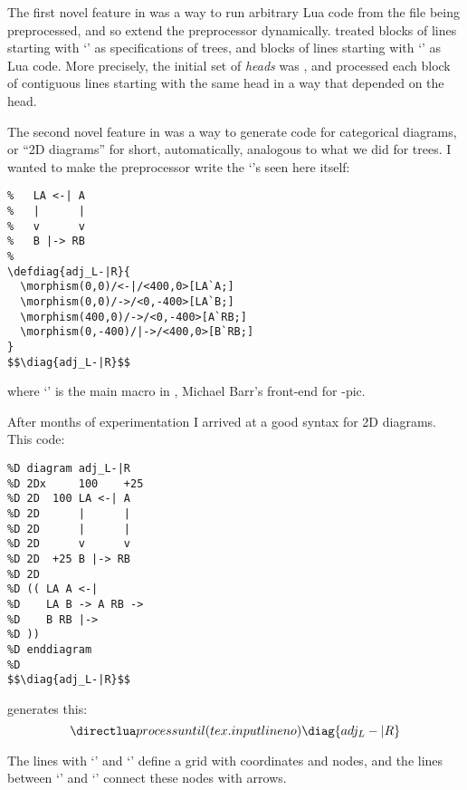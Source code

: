 \documentclass{ltugboat}
\begin{document}
The first novel feature in  was a way to run arbitrary Lua
code from the  file being preprocessed, and so extend the
preprocessor dynamically.  treated blocks of lines starting
with `\co{\%:}' as specifications of trees, and blocks of lines
starting with `' as Lua code. More precisely, the initial set
of {\sl heads} was , and 
processed each block of contiguous lines starting with the same head
in a way that depended on the head.

The second novel feature in  was a way to generate code for
categorical diagrams, or ``2D diagrams'' for short, automatically,
analogous to what we did for trees. I wanted to make the preprocessor write
the `'s seen here itself:

\begin{verbatim}
%   LA <-| A
%   |      |
%   v      v
%   B |-> RB
%
\defdiag{adj_L-|R}{
  \morphism(0,0)/<-|/<400,0>[LA`A;]
  \morphism(0,0)/->/<0,-400>[LA`B;]
  \morphism(400,0)/->/<0,-400>[A`RB;]
  \morphism(0,-400)/|->/<400,0>[B`RB;]
}
$$\diag{adj_L-|R}$$
\end{verbatim}
%
where `\co{\\morphism}' is the main macro in , Michael
Barr's front-end for \Xy-pic.

After months of experimentation I arrived at a good syntax for 2D
diagrams. This code:

\begin{verbatim}
%D diagram adj_L-|R
%D 2Dx     100    +25
%D 2D  100 LA <-| A
%D 2D      |      |
%D 2D      |      |
%D 2D      v      v
%D 2D  +25 B |-> RB
%D 2D
%D (( LA A <-|
%D    LA B -> A RB ->
%D    B RB |->
%D ))
%D enddiagram
%D
$$\diag{adj_L-|R}$$
\end{verbatim}
%
generates this:
%
$$\pu
  \diag{adj_L-|R}
$$

The lines with `' and `' define a grid with
coordinates and nodes, and the lines between `' and
`' connect these nodes with arrows.



%
\end{document}

